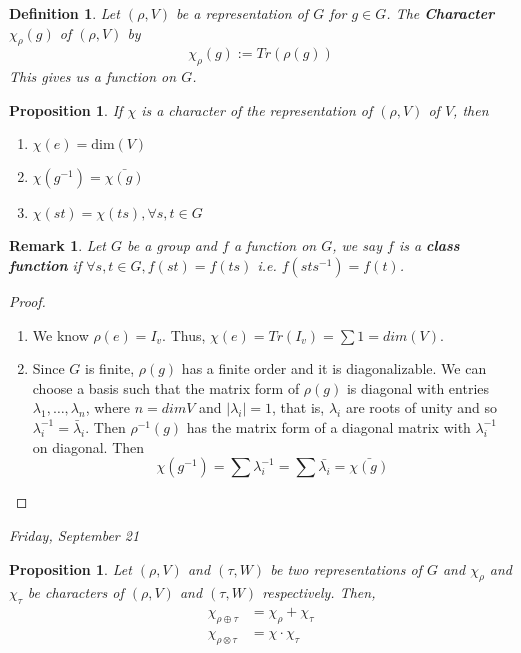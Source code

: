 \documentclass[letterpaper, leqno, 12pt]{article}
\newcommand{\fin}{\qquad \quad \hfill \framebox[1.75mm][l]{\,}}
\providecommand{\abs}[1]{\left\lvert#1\right\rvert}
\newcommand {\repV} {(\rho,V)}
\newcommand {\repW} {(\tau,W)}
\theoremstyle{stdthm}
\newtheorem{prop}[thm]{Proposition}
\theoremstyle{stddef}
\newtheorem{defn}[thm]{Definition}
\newtheorem{rem}[thm]{Remark} %
\theoremstyle{stdnonum}
\theoremstyle{stdqands}
\theoremstyle{stdbold}
\begin{document}
\begin{defn}
Let $\repV$ be a representation of $G$ for $g\in G$. The {\bf Character} $\chi_\rho(g)$ of $\repV$ by 
\[\chi_\rho(g):= Tr(\rho(g)) \]
This gives us a function on $G$. 
\end{defn}

\begin{prop}
If $\chi$ is a character of the representation of $\repV$ of $V$, then 
\begin{enumerate}
\item $\chi(e) = \text{dim}(V)$\\
\item $\chi(g^{-1}) = \bar{\chi(g)}$\\
\item $\chi(st) = \chi(ts), \forall s,t\in G$
\end{enumerate}
\end{prop}

\begin{rem}
Let $G$ be a group and $f$ a function on $G$, we say $f$ is a {\bf class function} if $\forall s,t\in G, f(st) = f(ts) $ i.e. $f(sts^{-1}) = f(t)$. 
\end{rem}

\begin{proof}
\begin{enumerate}
\item We know $\rho(e) = I_v$. Thus, $\chi(e) = Tr(I_v) = \sum 1 = dim(V)$. 
\item Since $G$ is finite, $\rho(g)$ has a finite order and it is diagonalizable. We can choose a basis such that the matrix form of $\rho(g)$ is diagonal with entries $\lambda_1,\dots,\lambda_n$, where $n = dim V$ and $\abs{\lambda_i} = 1$, that is, $\lambda_i$ are roots of unity and so $\lambda_i^{-1} = \bar{\lambda}_i$. Then $\rho^{-1}(g)$ has the matrix form of a diagonal matrix with $\lambda_i^{-1}$ on diagonal. Then
\[ \chi(g^{-1}) = \sum \lambda_{i}^{-1} = \sum \bar{\lambda_i} = \bar{\chi(g)} \]
\end{enumerate}
\end{proof}

\begin{center}
\emph{Friday, September 21}
\end{center}
\begin{prop}
Let $\repV$ and $\repW$ be two representations of $G$ and $\chi_\rho$ and $\chi_\tau$ be characters of $\repV$ and $\repW$ respectively. Then, 
\begin{align*}
\chi_{\rho \oplus \tau} &= \chi_\rho + \chi_\tau\\
\chi_{\rho \otimes \tau} &= \chi \cdot \chi_\tau
\end{align*}
\end{prop}
\end{document}
